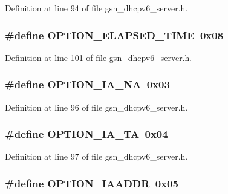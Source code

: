 Definition at line 94 of file gsn\_\-dhcpv6\_\-server.h.

\hypertarget{a00483_a008afb102f804ed2ccf48979730f78c1}{
\subsubsection[{OPTION\_\-ELAPSED\_\-TIME}]{\setlength{\rightskip}{0pt plus 5cm}\#define OPTION\_\-ELAPSED\_\-TIME~0x08}}
\label{a00483_a008afb102f804ed2ccf48979730f78c1}


Definition at line 101 of file gsn\_\-dhcpv6\_\-server.h.

\hypertarget{a00483_afe5b550dba54955b26ecaba13992ff6b}{
\subsubsection[{OPTION\_\-IA\_\-NA}]{\setlength{\rightskip}{0pt plus 5cm}\#define OPTION\_\-IA\_\-NA~0x03}}
\label{a00483_afe5b550dba54955b26ecaba13992ff6b}


Definition at line 96 of file gsn\_\-dhcpv6\_\-server.h.

\hypertarget{a00483_a9deb61f575a66b7b36e928f55777cfdd}{
\subsubsection[{OPTION\_\-IA\_\-TA}]{\setlength{\rightskip}{0pt plus 5cm}\#define OPTION\_\-IA\_\-TA~0x04}}
\label{a00483_a9deb61f575a66b7b36e928f55777cfdd}


Definition at line 97 of file gsn\_\-dhcpv6\_\-server.h.

\hypertarget{a00483_a957417efd54627f3c3ef58a75ff78bae}{
\subsubsection[{OPTION\_\-IAADDR}]{\setlength{\rightskip}{0pt plus 5cm}\#define OPTION\_\-IAADDR~0x05}}
\label{a00483_a957417efd54627f3c3ef58a75ff78bae}


